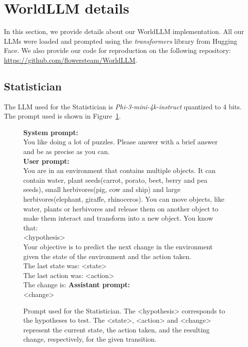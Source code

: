 \documentclass{article}
\begin{document}
\section{WorldLLM details} \label{app:worldllm}
In this section, we provide details about our WorldLLM implementation. All our LLMs were loaded and prompted using the \textit{transformers} library from Hugging Face. We also provide our code for reproduction on the following repository: \url{https://github.com/flowersteam/WorldLLM}.

\subsection{Statistician}
The LLM used for the Statistician is \textit{Phi-3-mini-4k-instruct} quantized to 4 bits. The prompt used is shown in Figure~\ref{prompt:Statistician}.

\begin{figure}[hbt]
    \begin{promptbox}{}
        \textbf{System prompt:}\\
        You like doing a lot of puzzles. Please answer with a brief answer and be as precise as you can. \\
        \textbf{User prompt:}\\
        You are in an environment that contains multiple objects. It can contain water, plant seeds(carrot, porato, beet, berry and pea seeds), small herbivores(pig, cow and ship) and large herbivores(elephant, giraffe, rhinoceros). You can move objects, like water, plants or herbivores and release them on another object to make them interact and transform into a new object. You know that: \\ <hypothesis> \\
        Your objective is to predict the next change in the environment given the state of the environment and the action taken. \\
        The last state was: 
        <state>  \\
        The last action was: 
        <action>\\
        The change is: 
        \textbf{Assistant prompt:}\\
        <change>
    \end{promptbox}
    \caption{Prompt used for the Statistician. The <hypothesis> corresponds to the hypotheses to test. The <state>, <action> and <change> represent the current state, the action taken, and the resulting change, respectively, for the given transition.}
    \label{prompt:Statistician}
\end{figure}
\end{document}
